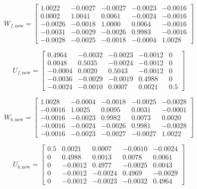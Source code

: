 \begin{equation}
    W_{f,\text{new}} = \begin{bmatrix}
     1.0022 & -0.0027 & -0.0027 & -0.0023 & -0.0016 \\
     0.0002 &  1.0041 &  0.0061 & -0.0024 & -0.0016 \\
    -0.0026 & -0.0018 &  1.0000 &  0.0064 & -0.0016 \\
    -0.0031 & -0.0029 & -0.0026 &  0.9983 & -0.0016 \\
    -0.0028 & -0.0025 & -0.0018 & -0.0004 &  1.0028
    \end{bmatrix}
\end{equation}

\begin{equation}
    U_{f,\text{new}} = \begin{bmatrix}
     0.4964 & -0.0032 & -0.0023 & -0.0012 &  0 \\
     0.0048 &  0.5035 & -0.0024 & -0.0012 &  0 \\
    -0.0004 &  0.0020 &  0.5043 & -0.0012 &  0 \\
    -0.0036 & -0.0029 & -0.0019 &  0.4988 &  0 \\
    -0.0024 & -0.0010 &  0.0007 &  0.0021 &  0.5
    \end{bmatrix}
\end{equation}

\begin{equation}
    W_{b,\text{new}} = \begin{bmatrix}
     1.0028 & -0.0004 & -0.0018 & -0.0025 & -0.0028 \\
    -0.0016 &  1.0025 &  0.0095 &  0.0031 & -0.0001 \\
    -0.0016 & -0.0023 &  0.9982 &  0.0073 &  0.0020 \\
    -0.0016 & -0.0024 & -0.0026 &  0.9981 & -0.0028 \\
    -0.0016 & -0.0023 & -0.0027 & -0.0027 &  1.0022
    \end{bmatrix}
\end{equation}

\begin{equation}
    U_{b,\text{new}} = \begin{bmatrix}
     0.5    &  0.0021 &  0.0007 & -0.0010 & -0.0024 \\
     0      &  0.4988 &  0.0013 &  0.0078 &  0.0061 \\
     0      & -0.0012 &  0.4977 & -0.0025 &  0.0043 \\
     0      & -0.0012 & -0.0024 &  0.4969 & -0.0029 \\
     0      & -0.0012 & -0.0023 & -0.0032 &  0.4964
    \end{bmatrix}
\end{equation}

